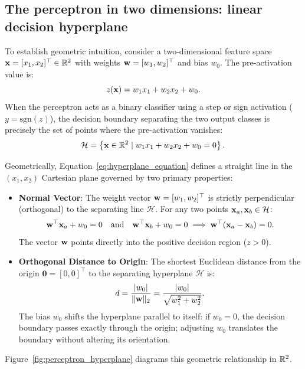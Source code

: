 \documentclass[../../main.tex]{subfiles}
\begin{document}
\subsection{The perceptron in two dimensions: linear decision hyperplane}
To establish geometric intuition, consider a two-dimensional feature space $\mathbf{x} = [x_1, x_2]^\top \in \mathbb{R}^2$ with weights $\mathbf{w} = [w_1, w_2]^\top$ and bias $w_0$. The pre-activation value is:
\begin{equation}
\label{eq:2d_linear_boundary}
z(\mathbf{x}) = w_1 x_1 + w_2 x_2 + w_0.
\end{equation}
When the perceptron acts as a binary classifier using a step or sign activation ($y = \text{sgn}(z)$), the decision boundary separating the two output classes is precisely the set of points where the pre-activation vanishes:
\begin{equation}
\label{eq:hyperplane_equation}
\mathcal{H} = \left\{ \mathbf{x} \in \mathbb{R}^2 \mid w_1 x_1 + w_2 x_2 + w_0 = 0 \right\}.
\end{equation}

Geometrically, Equation~\eqref{eq:hyperplane_equation} defines a straight line in the $(x_1, x_2)$ Cartesian plane governed by two primary properties:
\begin{itemize}
    \item \textbf{Normal Vector}: The weight vector $\mathbf{w} = [w_1, w_2]^\top$ is strictly perpendicular (orthogonal) to the separating line $\mathcal{H}$. For any two points $\mathbf{x}_a, \mathbf{x}_b \in \mathcal{H}$:
    \[
    \mathbf{w}^\top \mathbf{x}_a + w_0 = 0 \quad \text{and} \quad \mathbf{w}^\top \mathbf{x}_b + w_0 = 0 \implies \mathbf{w}^\top (\mathbf{x}_a - \mathbf{x}_b) = 0.
    \]
    The vector $\mathbf{w}$ points directly into the positive decision region ($z > 0$).
    \item \textbf{Orthogonal Distance to Origin}: The shortest Euclidean distance from the origin $\mathbf{0} = [0, 0]^\top$ to the separating hyperplane $\mathcal{H}$ is:
    \begin{equation}
    \label{eq:hyperplane_distance}
    d = \frac{|w_0|}{\|\mathbf{w}\|_2} = \frac{|w_0|}{\sqrt{w_1^2 + w_2^2}}.
    \end{equation}
    The bias $w_0$ shifts the hyperplane parallel to itself: if $w_0 = 0$, the decision boundary passes exactly through the origin; adjusting $w_0$ translates the boundary without altering its orientation.
\end{itemize}

Figure~\ref{fig:perceptron_hyperplane} diagrams this geometric relationship in $\mathbb{R}^2$.
\end{document}
